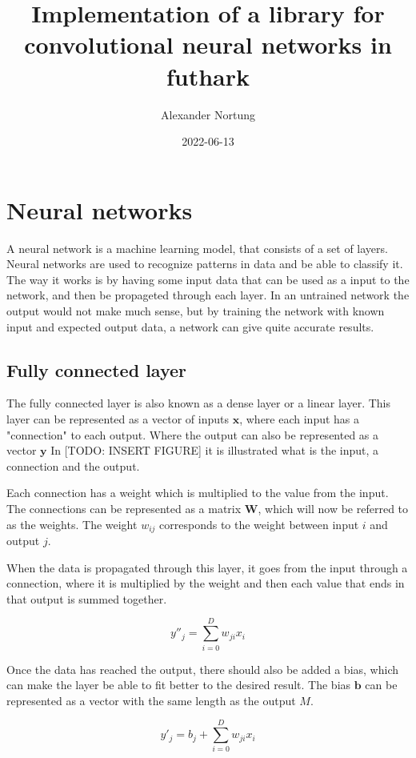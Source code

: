 \documentclass{article}
\title{Implementation of a library for convolutional neural networks in futhark}
\author{Alexander Nortung}
\date{2022-06-13}
\begin{document}
\maketitle

\section{Neural networks}%
\label{sec:Neural networks}

A neural network is a machine learning model, that consists of a set of layers. Neural networks are used to recognize patterns in data and be able to classify it. The way it works is by having some input data that can be used as a input to the network, and then be propageted through each layer. In an untrained network the output would not make much sense, but by training the network with known input and expected output data, a network can give quite accurate results.

\subsection{Fully connected layer}%
\label{sub:Fully connected layer}

The fully connected layer is also known as a dense layer or a linear layer.
This layer can be represented as a vector of inputs $\bm{x}$, where each input has a "connection" to each output. Where the output can also be represented as a vector $\bm{y}$
In [TODO: INSERT FIGURE] it is illustrated what is the input, a connection and the output.

Each connection has a weight which is multiplied to the value from the input.
The connections can be represented as a matrix $\bm{W}$, which will now be referred to as the weights.
The weight $w_{ij}$ corresponds to the weight between input $i$ and output $j$.

When the data is propagated through this layer, it goes from the input through a connection, where it is multiplied by the weight and then each value that ends in that output is summed together.

$$y''_j = \sum_{i=0}^D w_{ji}x_i  $$

Once the data has reached the output, there should also be added a bias, which can make the layer be able to fit better to the desired result.
The bias $\bm{b}$ can be represented as a vector with the same length as the output $M$.

$$y'_j = b_j + \sum_{i=0}^D w_{ji}x_i$$
\end{document}
